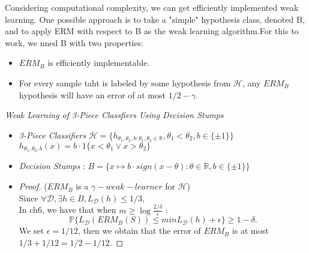 Considering computational complexity, we can get efficiently implemented weak learning.
One possible approach is to take a "simple" hypothesis class, denoted B, and to apply
ERM with respect to B as the weak learning algorithm.For this to work, we nned B with 
two properties:
\begin{itemize}
	\item $ERM_B$ is efficiently implementable.
	\item For every sample taht is labeled by some hypothesis from $\mathcal{H}$, any
		$ERM_B$ hypothesis will have an error of at most $1/2-\gamma$.
\end{itemize}

\begin{exam}
	\emph{Weak Learning of 3-Piece Classfiers Using Decision Stumps}
	\begin{itemize}
		\item \emph{3-Piece Classifiers} $\mathcal{H} = \{ h_{\theta_1,\theta_2,b:\theta_1, \theta_2 \in \mathbb{R}},
			\theta_1 < \theta_2, b\in\{ \pm 1 \} \}$\\
			$h_{\theta_1,\theta_2,b}(x) = b \cdot {1} \{ x<\theta_1 \vee x>\theta_2 \}$	
		\item \emph{Decision Stumps} : 
			$B = \{ x \mapsto b \cdot sign(x-\theta) : \theta \in \mathbb{R}, b \in \{ \pm 1 \} \}$
		\item
			\begin{proof}
				($ERM_B$ is a $\gamma-weak-learner$ for $\mathcal{H}$)\\
				Since $\forall \mathcal{D}, \exists h \in B, L_\mathcal{D}(h) \le 1/3$,\\
				In ch6, we have that when $m \ge \log\frac{2/\delta}{\epsilon}$ : 
				\[
					\mathbb{P}\{L_\mathcal{D}(ERM_B(S)) \le min L_\mathcal{D}(h) + \epsilon\} \ge 1-\delta
				.\]
				We set $\epsilon = 1/12$, then we obtain that the error of $ERM_B$ is at most
				$1/3+1/12 = 1/2-1/12$.
			\end{proof}
	\end{itemize}
\end{exam}

